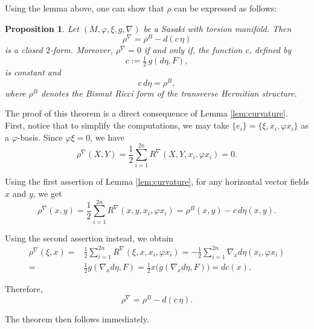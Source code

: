 \documentclass{article}
\makeatletter
\renewenvironment{proof}[1][\proofname]{%
  \par\pushQED{\qed}%
  \normalfont\topsep6\p@\@plus6\p@\relax
  \trivlist
  \item[\hskip\labelsep
        \textbf{\textup{#1}}\@addpunct{.}]\ignorespaces
}{%
  \popQED\endtrivlist\@endpefalse
}
\newtheorem{prop}[thm]{Proposition}
\theoremstyle{definition}
\renewcommand{\phi}{\varphi}
\numberwithin{equation}{section}
\makeatother
\begin{document}
Using the lemma above, one can show that $\rho$ can be expressed as follows:
\begin{prop} \label{prop:rhoB}
Let $(M,\phi,\xi,g, \nabla)$ be a Sasaki with torsion manifold. Then \[\rho^\nabla = \rho^B - d(c \, \eta)\]
is a closed $2$-form. Moreover, $\rho^\nabla = 0$ if and only if, the function $c$, defined by 
\[
c := \tfrac12\, g(d\eta, F),
\]
is constant and
\[
c\, d\eta = \rho^B,
\]
where $\rho^B$ denotes the Bismut Ricci form of the transverse Hermitian structure.\label{thm:BHE}
\end{prop}
\begin{proof}
The proof of this theorem is a direct consequence of Lemma \ref{lem:curvature}. First, notice that to simplify the computations, we may take $\{e_i\}=\{\xi, x_i, \phi x_i\}$ as a $\phi$-basis. Since $\phi \xi = 0$, we have
\[
\rho^\nabla(X,Y) = \frac{1}{2} \sum_{i=1}^{2n} R^\nabla (X,Y,x_i, \phi x_i) = 0.
\]

Using the first assertion of Lemma \ref{lem:curvature}, for any horizontal vector fields $x$ and $y$, we get
\[
\rho^\nabla(x,y) = \frac{1}{2} \sum_{i=1}^{2n} R^\nabla (x,y,x_i, \phi x_i) = \rho^B(x,y) - c \, d\eta(x,y). 
\]

Using the second assertion instead, we obtain
\begin{align*}
\rho^\nabla(\xi,x) =& \frac{1}{2} \sum_{i=1}^{2n} R^\nabla (\xi,x,x_i, \phi x_i) = - \frac{1}{2} \sum_{i=1}^{2n} \nabla_x d\eta (x_i, \phi x_i) \\=
&\frac{1}{2} g(\nabla_x d\eta, F) = \frac{1}{2} x \big(g(\nabla_x d\eta, F)\big) = dc(x). 
\end{align*}

Therefore, 
\[
\rho^\nabla = \rho^B - d(c \, \eta).
\]

The theorem then follows immediately.
\end{proof}
\end{document}
